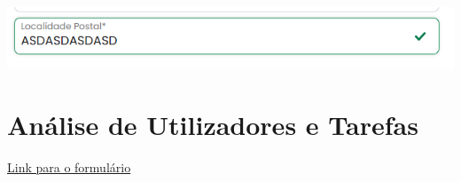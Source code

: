 \documentclass[a4paper,12pt]{article}
\begin{document}
\begin{center}
    \vspace{0.5cm}
    \includegraphics[width=\textwidth, keepaspectratio]{heuristics/08validacao_postal_registo.png}
\end{center}

\newpage
\section{Análise de Utilizadores e Tarefas}

\begin{center}
    \href{https://forms.gle/mGgTZJcjzfStsLvn6}{Link para o formulário}


\end{center}
\end{document}
